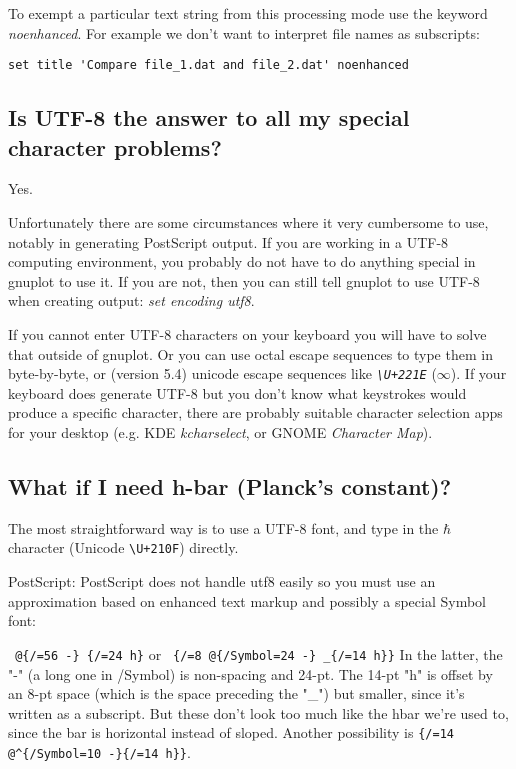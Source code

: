 \documentclass[letter,11pt]{article}
\begin{document}
{To exempt a particular text string from this processing mode use the keyword
{\em noenhanced}.  For example we don't want to interpret file names as subscripts:
\small
\begin{verbatim}
set title 'Compare file_1.dat and file_2.dat' noenhanced
\end{verbatim}
\normalsize

\subsection{Is UTF-8 the answer to all my special character problems?}

Yes.

Unfortunately there are some circumstances where it very cumbersome to use,
notably in generating PostScript output.
If you are working in a UTF-8 computing environment, you probably do not have to
do anything special in gnuplot to use it.
If you are not, then you can still tell gnuplot to use UTF-8 when creating output:
{\em set encoding utf8}.

If you cannot enter UTF-8 characters on your keyboard you will have to solve
that outside of gnuplot. Or you can use octal escape sequences to type them in
byte-by-byte, or (version 5.4) unicode escape sequences like
{\em \verb&\U+221E&} ($\infty$).
If your keyboard does generate UTF-8 but you don't know what keystrokes would
produce a specific character, there are probably suitable character selection
apps for your desktop (e.g. KDE {\em kcharselect}, or GNOME {\em Character Map}).

\subsection{What if I need h-bar (Planck's constant)?}

The most straightforward way is to use a UTF-8 font, and type in the
$\hbar$ character (Unicode {\verb&\U+210F&}) directly.

PostScript: PostScript does not handle utf8 easily so you must use an
approximation based on enhanced text markup and possibly a special
Symbol font:

\verb+ @{/=56 -} {/=24 h}+ or
\verb+ {/=8 @{/Symbol=24 -} _{/=14 h}}+
In the latter, the "-" (a long one in /Symbol) is non-spacing and 24-pt.
The 14-pt "h" is offset by an 8-pt space (which is the space preceding
the "\_") but smaller, since it's written as a subscript.
But these don't look too much like the hbar we're used to, since the bar
is horizontal instead of sloped.
Another possibility is \verb+{/=14 @^{/Symbol=10 -}{/=14 h}}+.

}
\end{document}
